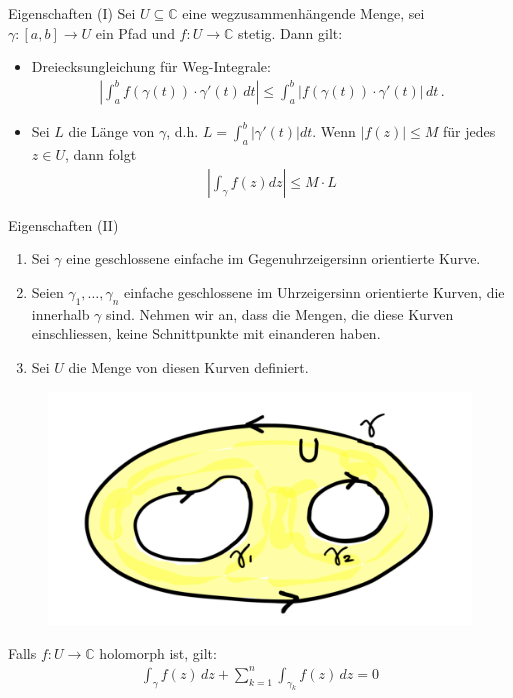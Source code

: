 \documentclass[a4paper,10pt]{article}
\begin{document}
\begin{mainbox}{Eigenschaften (I)}
  Sei \(U\subseteq\mathbb{C}\) eine wegzusammenhängende Menge, sei \(\gamma\colon[a,b]\to U\) ein Pfad und \(f\colon U\to\mathbb{C}\) stetig. Dann gilt:

  \begin{itemize}
    \item{
      Dreiecksungleichung für Weg-Integrale:
      \begin{align*}\left|\int_a^b f(\gamma (t)) \cdot \gamma'(t) \,dt\right| \leq \int_a^b \left|f(\gamma (t))\cdot \gamma'(t)\right|\, dt\, .\end{align*}
    }
    \item{
      Sei \(L\) die Länge von \(\gamma\), d.h. \(L=\int_a^b|\gamma'(t)|dt\). Wenn \(|f(z)| \leq M\) für jedes \( z\in U\), dann folgt \begin{align*} \left|\int_{\gamma} f(z)dz\right| \leq M\cdot L \end{align*}
    }
  \end{itemize}
\end{mainbox}

\begin{mainbox}{Eigenschaften (II)}
  \begin{enumerate}
    \item Sei \(\gamma\) eine geschlossene einfache im Gegenuhrzeigersinn orientierte Kurve.
    \item Seien \(\gamma_1,\dots,\gamma_n\) einfache geschlossene im Uhrzeigersinn orientierte Kurven, die innerhalb \(\gamma\) sind. Nehmen wir an, dass die Mengen, die diese Kurven einschliessen, keine Schnittpunkte mit einanderen haben.
    \item Sei \(U\) die Menge von diesen Kurven definiert.
  \end{enumerate} 

  \begin{figure}[H]
    \centering 
    \includegraphics[width=0.6\linewidth]{assets/3-4-1.png}
  \end{figure}
  
  Falls \(f\colon U\to\mathbb{C}\) holomorph ist, gilt:
  \begin{align*} \int_\gamma f(z)\,dz+\sum_{k=1}^n\int_{\gamma_k}f(z)\,dz=0 \end{align*}
\end{mainbox}
\end{document}

